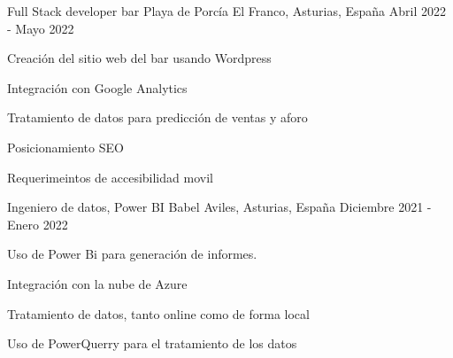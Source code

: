 

\begin{cventries}

    \cventry
    {Full Stack developer} %
    {bar Playa de Porcía} %
    {El Franco, Asturias, España} %
    {Abril 2022 - Mayo 2022} %
    {
        \begin{cvitems} %
            \item {Creación del sitio web del bar usando Wordpress}
            \item  {Integración con Google Analytics}
            \item {Tratamiento de datos para predicción de ventas y aforo}
            \item {Posicionamiento SEO}
            \item {Requerimeintos de accesibilidad movil}
        \end{cvitems}
    }

    \cventry
    {Ingeniero de datos, Power BI} %
    {Babel} %
    {Aviles, Asturias, España} %
    {Diciembre 2021 - Enero 2022} %
    {
        \begin{cvitems} %
            \item {Uso de Power Bi para generación de informes.}
            \item  {Integración con la nube de Azure}
            \item {Tratamiento de datos, tanto online como de forma local}
            \item {Uso de PowerQuerry para el tratamiento de los datos}
        \end{cvitems}
    }


\end{cventries}
